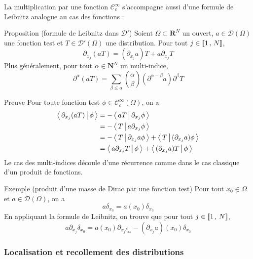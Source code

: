         La multiplication par une fonction $\mathcal{C}_c^{\infty}$ s’accompagne aussi d’une formule de Leibnitz analogue au cas des fonctions :

        \begin{omed}{Proposition (formule de Leibnitz dans $\mathcal{D}'$)}
            Soient $\Omega \subset \mathbf{R}^N$ un ouvert, $a \in \mathcal{D}(\Omega)$ une fonction test et $T \in \mathcal{D}'(\Omega)$ une distribution. Pour tout $j \in \left[\!\left[ 1 \, , \, N \right]\!\right]$, 
            \[ \partial_{x_j}(aT)  = (\partial_{x_j} a) T + a \partial_{x_j} T \]   
            Plus généralement, pour tout $\alpha \in \mathbf{N}^N$ un multi-indice, 
            \[ \partial^{\alpha}(aT) = \sum_{\beta \leq \alpha} \binom{\alpha}{\beta} (\partial^{\alpha - \beta} a) \partial^{\beta} T \]   
        \end{omed}

        \begin{demo}{Preuve}
            Pour toute fonction test $\phi \in \mathcal{C}^{\infty}_c(\Omega)$, on a 
            \begin{align*}
                \left< \, \partial_{x_j} (aT) \, \middle| \, \phi \, \right> 
                &= - \left< \, aT \, \middle| \, \partial_{x_j} \phi \, \right> \\
                &= - \left< \, T \, \middle| \, a \partial_{x_j} \phi \, \right> \\
                &= - \left< \, T \, \middle| \, \partial_{x_j} a \phi \, \right> + \left< \, T \, \middle| \, (\partial_{x_j}a) \phi \, \right> \\
                &= \left< \, a \partial_{x_j} T \, \middle| \, \phi \, \right> + \left< \, (\partial_{x_j} a)T \, \middle| \, \phi \, \right>
            \end{align*}
            Le cas des multi-indices découle d’une récurrence comme dans le cas classique d’un produit de fonctions.
        \end{demo}

        \begin{demo}{Exemple (produit d’une masse de Dirac par une fonction test)}
            Pour tout $x_0 \in \Omega$ et $a \in \mathcal{D}(\Omega)$, on a 
            \[ a \delta_{x_0} = a(x_0) \delta_{x_0} \] 
            En appliquant la formule de Leibnitz, on trouve que pour tout $j \in \left[\!\left[ 1 \, , \, N \right]\!\right]$, 
            \[ a \partial_{x_j} \delta_{x_0} = a(x_0) \partial_{x_j \delta_{x_0}} - (\partial_{x_j} a)(x_0) \delta_{x_0} \]   
        \end{demo}

        \subsubsection{Localisation et recollement des distributions}

